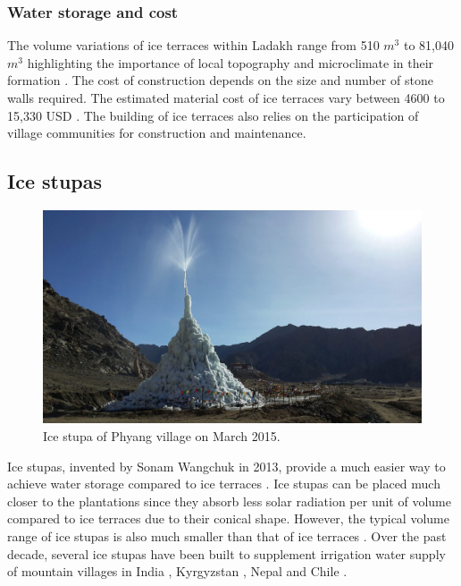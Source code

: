 \subsubsection{Water storage and cost}

The volume variations of ice terraces within Ladakh range from 510 $m^3$ to 81,040 $m^3$ highlighting
the importance of local topography and microclimate in their formation
\citep{nusserSociohydrologyArtificialGlaciers2019, norphelSnowWaterHarvesting2015}. The cost of construction
depends on the size and number of stone walls required. The estimated material cost of ice terraces vary between
4600 to 15,330 USD \citep{nusserSociohydrologyArtificialGlaciers2019}. The building of ice terraces also relies
on the participation of village communities for construction and maintenance. 

\subsection{Ice stupas}

\begin{figure}[htb]
\centering
\includegraphics[width=\textwidth]{figs/IS_example.jpg}
\caption{Ice stupa of Phyang village on March 2015.}
\label{fig:ISexample}
\end{figure}

Ice stupas, invented by Sonam Wangchuk in 2013, provide a much easier way to achieve water storage compared to
ice terraces \citep{wangchukIceStupaArtificial2014}. Ice stupas can be placed much closer to the plantations
since they absorb less solar radiation per unit of volume compared to ice terraces due to their conical shape.
However, the typical volume range of ice stupas is also much smaller than that of ice
terraces \citep{nusserSociohydrologyArtificialGlaciers2019}. Over the past decade, several ice stupas have been
built to supplement irrigation water supply of mountain villages in India
\citep{wangchukIceStupaCompetition2020, palmerStoringFrozenWater2022, aggarwalAdaptationClimateChange2021},
Kyrgyzstan \citep{bbcnewsBrightArtificialGlacier2020}, Nepal and Chile
\citep{reutersConservationistsChileAim2021}.



